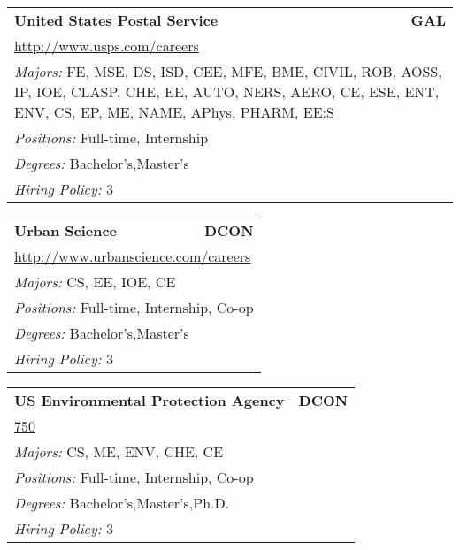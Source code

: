 \documentclass[twoside]{article}
\begin{document}
\begin{center}
\begin{multicols}{3}
\begin{FlushLeft}
\begin{minipage}{.9\columnwidth}\begin{tabularx}{.95\columnwidth}{Xr}
                 {\Large\bf United States Postal Service} & {\Large\bf GAL}\\
    \multicolumn{2}{p{.95\columnwidth}}{\url{http://www.usps.com/careers}}\\
    \multicolumn{2}{p{.95\columnwidth}}{\emph{Majors:} FE, MSE, DS, ISD, CEE, MFE, BME, CIVIL, ROB, AOSS, IP, IOE, CLASP, CHE, EE, AUTO, NERS, AERO, CE, ESE, ENT, ENV, CS, EP, ME, NAME, APhys, PHARM, EE:S}\\
    \multicolumn{2}{p{.95\columnwidth}}{\emph{Positions:} Full-time, Internship}\\
    \multicolumn{2}{p{.95\columnwidth}}{\emph{Degrees:} Bachelor's,Master's}\\
    \multicolumn{2}{p{.95\columnwidth}}{\emph{Hiring Policy:} 3}\\
    \end{tabularx}
    
\end{minipage}
 
\begin{minipage}{.9\columnwidth}\begin{tabularx}{.95\columnwidth}{Xr}
                 {\Large\bf Urban Science} & {\Large\bf DCON}\\
    \multicolumn{2}{p{.95\columnwidth}}{\url{http://www.urbanscience.com/careers}}\\
    \multicolumn{2}{p{.95\columnwidth}}{\emph{Majors:} CS, EE, IOE, CE}\\
    \multicolumn{2}{p{.95\columnwidth}}{\emph{Positions:} Full-time, Internship, Co-op}\\
    \multicolumn{2}{p{.95\columnwidth}}{\emph{Degrees:} Bachelor's,Master's}\\
    \multicolumn{2}{p{.95\columnwidth}}{\emph{Hiring Policy:} 3}\\
    \end{tabularx}
    
\end{minipage}
 
\begin{minipage}{.9\columnwidth}\begin{tabularx}{.95\columnwidth}{Xr}
                 {\Large\bf US Environmental Protection Agency} & {\Large\bf DCON}\\
    \multicolumn{2}{p{.95\columnwidth}}{\url{750}}\\
    \multicolumn{2}{p{.95\columnwidth}}{\emph{Majors:} CS, ME, ENV, CHE, CE}\\
    \multicolumn{2}{p{.95\columnwidth}}{\emph{Positions:} Full-time, Internship, Co-op}\\
    \multicolumn{2}{p{.95\columnwidth}}{\emph{Degrees:} Bachelor's,Master's,Ph.D.}\\
    \multicolumn{2}{p{.95\columnwidth}}{\emph{Hiring Policy:} 3}\\
    \end{tabularx}
    

\end{minipage}
\end{FlushLeft}
\end{multicols}
\end{center}
\end{document}
